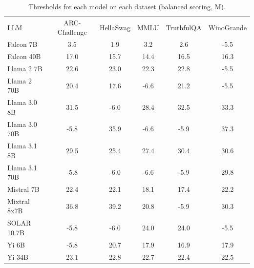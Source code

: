 \begin{table}[h]
\caption{Thresholds for each model on each dataset (balanced scoring, M). }
\label{tab:thresholds_logit_max_k20_w1}
\centering
\begin{tabular}{l S[table-format=3.1] S[table-format=3.1] S[table-format=3.1] S[table-format=3.1] S[table-format=3.1]}
\toprule
LLM & ARC-Challenge & HellaSwag & MMLU & TruthfulQA & WinoGrande \\ 
\cmidrule(lr){1-1} \cmidrule(lr){2-2} \cmidrule(lr){3-3} \cmidrule(lr){4-4} \cmidrule(lr){5-5} \cmidrule(lr){6-6}
Falcon 7B & 3.5 & 1.9 & 3.2 & 2.6 & -5.5\\
Falcon 40B & 17.0 & 15.7 & 14.4 & 16.5 & 16.3\\
Llama 2 7B & 22.6 & 23.0 & 22.3 & 22.8 & -5.5\\
Llama 2 70B & 20.4 & 17.6 & -6.6 & 21.2 & -5.5\\
Llama 3.0 8B & 31.5 & -6.0 & 28.4 & 32.5 & 33.3\\
Llama 3.0 70B & -5.8 & 35.9 & -6.6 & -5.9 & 37.3\\
Llama 3.1 8B & 29.5 & 25.4 & 27.4 & 30.4 & 30.6\\
Llama 3.1 70B & -5.8 & -6.0 & -6.6 & -5.9 & 29.8\\
Mistral 7B & 22.4 & 22.1 & 18.1 & 17.4 & 22.2\\
Mixtral 8x7B & 36.8 & 39.2 & 20.8 & -5.9 & 30.3\\
SOLAR 10.7B & -5.8 & -6.0 & 24.0 & 24.0 & -5.5\\
Yi 6B & -5.8 & 20.7 & 17.9 & 16.9 & 17.9\\
Yi 34B & 23.1 & 22.8 & 22.7 & 22.4 & 22.5\\
\bottomrule
\end{tabular}
\end{table}
